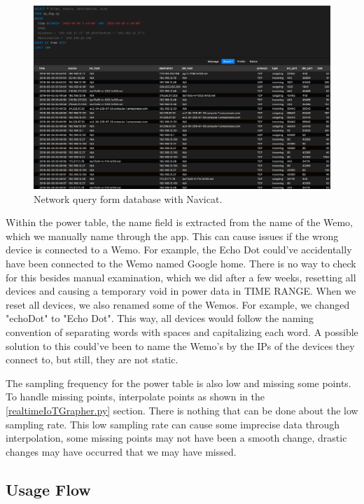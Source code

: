 \begin{figure}[H]
    \centering
    \includegraphics[width=1\textwidth]{figures/navicatNetworkQuery.png}
    \caption{Network query form database with Navicat.}
    \label{fig:navicatNetworkQuery}
\end{figure}
Within the power table, the name field is extracted from the name of the Wemo, which we manually name through the app. This can cause issues if the wrong device is connected to a Wemo. For example, the Echo Dot could've accidentally have been connected to the Wemo named Google home. There is no way to check for this besides manual examination, which we did after a few weeks, resetting all devices and causing a temporary void in power data in TIME RANGE. When we reset all devices, we also renamed some of the Wemos. For example, we changed "echoDot" to "Echo Dot". This way, all devices would follow the naming convention of separating words with spaces and capitalizing each word. A possible solution to this could've been to name the Wemo's by the IPs of the devices they connect to, but still, they are not static.

The sampling frequency for the power table is also low and missing some points. To handle missing points, interpolate points as shown in the \ref{realtimeIoTGrapher.py} section. There is nothing that can be done about the low sampling rate. This low sampling rate can cause some imprecise data through interpolation, some missing points may not have been a smooth change, drastic changes may have occurred that we may have missed.

\subsection{Usage Flow}

